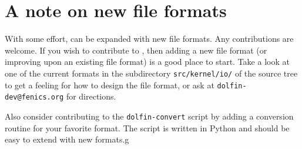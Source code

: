 \section{A note on new file formats}

With some effort, \dolfin{} can be expanded with new file formats. Any
contributions are welcome. If you wish to contribute to \dolfin{},
then adding a new file format (or improving upon an existing file
format) is a good place to start. Take a look at one of the current
formats in the subdirectory \texttt{src/kernel/io/} of the \dolfin{}
source tree to get a feeling for how to design the file format, or ask
at \texttt{dolfin-dev@fenics.org} for directions.

Also consider contributing to the \texttt{dolfin-convert} script by
adding a conversion routine for your favorite format. The script is
written in Python and should be easy to extend with new formats.g
